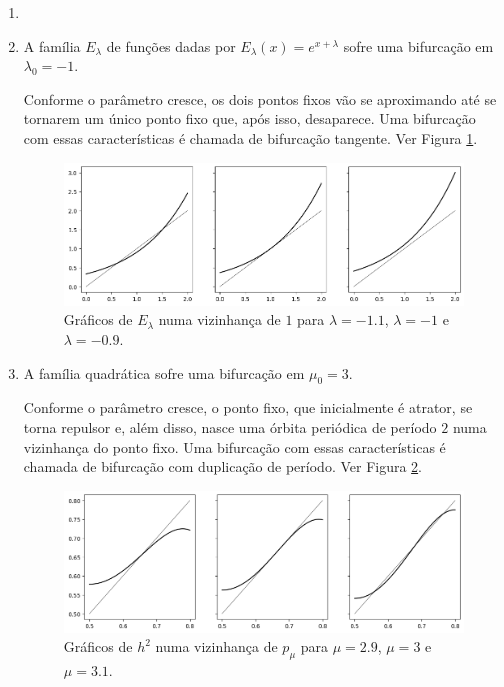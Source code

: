\begin{example}
\begin{enumerate}[label=\alph*)]\item[]
\item 
A família $E_\lambda$ de funções dadas por $E_\lambda(x) = e^{x + \lambda}$ sofre uma bifurcação em $\lambda_0 = -1$.

Conforme o parâmetro cresce, os dois pontos fixos vão se aproximando até se tornarem um único ponto fixo que, após isso, desaparece. Uma bifurcação com essas características é chamada de bifurcação tangente. Ver Figura \ref{e_lambda}.

\begin{figure}[!htb]
\centering
\includegraphics[scale=0.6]{images/e_lambda.png}
\caption{Gráficos de $E_\lambda$ numa vizinhança de $1$ para $\lambda = -1.1$, $\lambda = -1$ e $\lambda = -0.9$.}
\label{e_lambda}
\end{figure}

\item A família quadrática sofre uma bifurcação em $\mu_0 = 3$.

Conforme o parâmetro cresce, o ponto fixo, que inicialmente é atrator, se torna repulsor e, além disso, nasce uma órbita periódica de período $2$ numa vizinhança do ponto fixo. Uma bifurcação com essas características é chamada de bifurcação com duplicação de período. Ver Figura \ref{h_mu^2}.

\begin{figure}[!htb]
\centering
\includegraphics[scale=0.6]{images/h_3^2.png}
\caption{Gráficos de $h^2$ numa vizinhança de $p_\mu$ para $\mu = 2.9$, $\mu = 3$ e $\mu = 3.1$.}
\label{h_mu^2}
\end{figure}

\end{enumerate}
\end{example}

